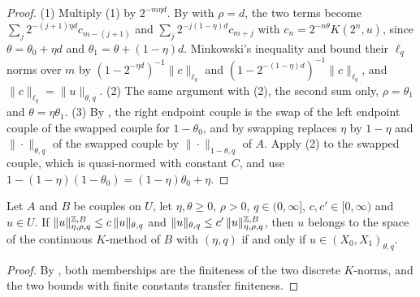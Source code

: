 \begin{proof}
\leanok
(1) Multiply  (1) by $2^{-m\eta d}$. By
 with $\rho = d$, the two terms become
$\sum_j 2^{-(j+1)\eta d} c_{m-(j+1)}$ and $\sum_j 2^{-j(1-\eta)d} c_{m+j}$ with
$c_n = 2^{-n\theta} K(2^n, u)$, since $\theta = \theta_0 + \eta d$ and
$\theta_1 = \theta + (1 - \eta) d$. Minkowski's inequality and
 bound their $\ell_q$ norms over $m$ by
$(1 - 2^{-\eta d})^{-1} \|c\|_{\ell_q}$ and $(1 - 2^{-(1-\eta)d})^{-1} \|c\|_{\ell_q}$, and
$\|c\|_{\ell_q} = \|u\|_{\theta, q}$. (2) The same argument with  (2), the
second sum only, $\rho = \theta_1$ and $\theta = \eta\theta_1$. (3) By ,
the right endpoint couple is the swap of the left endpoint couple of the swapped couple for
$1 - \theta_0$, and by  swapping replaces $\eta$ by $1 - \eta$ and
$\|\cdot\|_{\theta, q}$ of the swapped couple by $\|\cdot\|_{1-\theta, q}$ of $A$. Apply (2) to the
swapped couple, which is quasi-normed with constant $C$, and use
$1 - (1 - \eta)(1 - \theta_0) = (1 - \eta)\theta_0 + \eta$.
\end{proof}

\begin{lemma}
\label{lem:comparable-discrete-k-norms}
\leanok
{}
Let $A$ and $B$ be couples on $U$, let $\eta, \theta \geq 0$, $\rho > 0$, $q \in (0, \infty]$,
$c, c' \in [0, \infty)$ and $u \in U$. If
$\|u\|^{\mathbb{Z}, B}_{\eta, \rho, q} \leq c \, \|u\|_{\theta, q}$ and
$\|u\|_{\theta, q} \leq c' \, \|u\|^{\mathbb{Z}, B}_{\eta, \rho, q}$, then $u$ belongs to the space of
the continuous $K$-method of $B$ with $(\eta, q)$ if and only if $u \in (X_0, X_1)_{\theta, q}$.
\end{lemma}

\begin{proof}
\leanok
By , both memberships are the finiteness of the two
discrete $K$-norms, and the two bounds with finite constants transfer finiteness.
\end{proof}

